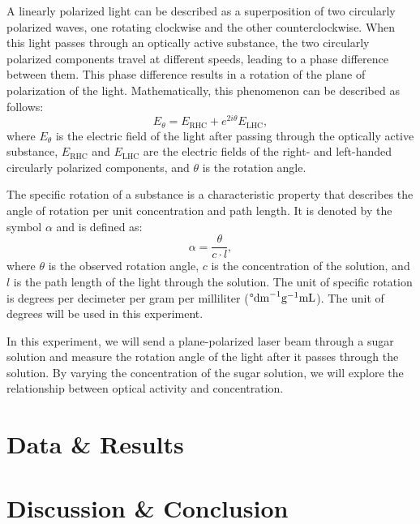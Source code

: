 \documentclass[10pt]{article}
\begin{document}
A linearly polarized light can be described as a superposition of two circularly polarized waves, one rotating clockwise and the other counterclockwise. When this light passes through an optically active substance, the two circularly polarized components travel at different speeds, leading to a phase difference between them. This phase difference results in a rotation of the plane of polarization of the light. Mathematically, this phenomenon can be described as follows:
\begin{equation}
    E_{\theta} = E_{\text{RHC}} + e^{2i\theta}E_{\text{LHC}},
\end{equation}
where $E_{\theta}$ is the electric field of the light after passing through the optically active substance, $E_{\text{RHC}}$ and $E_{\text{LHC}}$ are the electric fields of the right- and left-handed circularly polarized components, and $\theta$ is the rotation angle.

The specific rotation of a substance is a characteristic property that describes the angle of rotation per unit concentration and path length. It is denoted by the symbol $\alpha$ and is defined as:
\begin{equation}
    \alpha = \frac{\theta}{c \cdot l},
\end{equation}
where $\theta$ is the observed rotation angle, $c$ is the concentration of the solution, and $l$ is the path length of the light through the solution. The unit of specific rotation is degrees per decimeter per gram per milliliter ($\degree \text{dm}^{-1} \text{g}^{-1} \text{mL}$). The unit of degrees will be used in this experiment.


In this experiment, we will send a plane-polarized laser beam through a sugar solution and measure the rotation angle of the light after it passes through the solution. By varying the concentration of the sugar solution, we will explore the relationship between optical activity and concentration.

\section{Data \& Results}

\section{Discussion \& Conclusion}

\printbibliography
\end{document}
